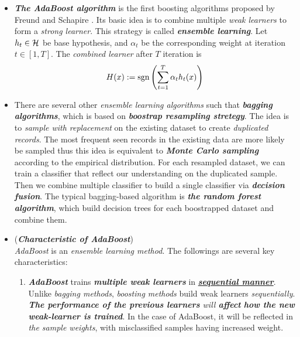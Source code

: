 \documentclass[11pt]{article}
\begin{document}
\begin{itemize}
\item \emph{\textbf{The AdaBoost algorithm}} is the first boosting algorithms proposed by Freund and Schapire \citep{schapire2012boosting}. Its basic idea is to combine multiple \emph{weak learners} to form a \emph{strong learner}. This strategy is called \emph{\textbf{ensemble learning}}. Let $h_t \in {\mathcal H}$ be base hypothesis, and $\alpha_t$ be the corresponding weight at iteration $t \in [1,T]$. The \emph{combined learner} after $T$ iteration is
\begin{align*}
H(x) := \text{sgn}\left(\sum_{t=1}^{T}\alpha_t h_t(x)\right)
\end{align*}

\item \begin{remark}
There are several other \emph{ensemble learning algorithms} such that \emph{\textbf{bagging algorithms}}, which is based on \emph{\textbf{boostrap resampling stretegy}}. The idea is to \emph{sample with replacement} on the existing dataset to create \emph{duplicated records}. The most frequent seen records in the existing data are more likely be sampled thus this idea is equivalent to \emph{\textbf{Monte Carlo sampling}} according to the empirical distribution. For each resampled dataset, we can train a classifier that reflect our understanding on the duplicated sample. Then we combine multiple classifier to build a single classifier via \emph{\textbf{decision fusion}}. The typical bagging-based algorithm is \emph{\textbf{the random forest algorithm}}, which build decision trees for each boostrapped dataset and combine them.
\end{remark}

\item \begin{remark}(\textbf{\emph{Characteristic of AdaBoost}}) \\
\emph{AdaBoost} is an \emph{ensemble learning method}. The followings are several key characteristics:
\begin{enumerate}
\item  \emph{\textbf{AdaBoost}}  trains \emph{\textbf{multiple weak learners}} in \underline{\emph{\textbf{sequential manner}}}. Unlike \emph{bagging methods}, \emph{boosting methods} build weak learners \emph{sequentially}. \emph{\textbf{The performance of the previous learners} will \textbf{affect} \textbf{how the new weak-learner is trained}}. In the case of AdaBoost, it will be reflected in \emph{the sample weights}, with misclassified samples having increased weight. 


\end{enumerate}
\end{remark}
\end{itemize}
\end{document}
